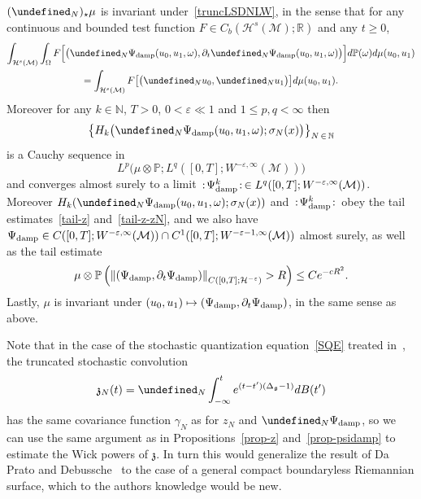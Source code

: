 \documentclass[AHL,Unicode,longabstracts,published]{cedram}
\newcommand{\damp}{\textup{damp}}
\newcommand{\R}{\mathbb{R}}
\newcommand{\Prob}{\mathbb{P}}
\newcommand{\N}{\mathbb{N}}
\let\P= \undefined
\newcommand{\P}{\mathbf{P}}
\newcommand{\M}{\mathcal{M}}
\renewcommand{\H}{\mathcal{H}}
\newcommand{\g}{\mathfrak{g}}
\newcommand{\frkz}{\mathfrak{z}}
\newcommand{\Dlg}{\Delta_{\g}}
\newcommand{\eps}{\varepsilon}
\newcommand{\s}{\sigma}
\newcommand{\dt}{\partial_t}
\renewcommand{\o}{\omega}
\renewcommand{\O}{\Omega}
\begin{document}
\begin{prop}\label{prop-psidamp}
$(\P_N)_{\star}\mu$ is invariant under~\eqref{truncLSDNLW}, in the sense that for any continuous and bounded test function $F\in C_b(\H^s(\M);\R)$ and any $t\ge 0$,
\begin{multline*}
\int_{\H^s(\M)}\int_\O F\Big[\big(\P_N\Psi_\damp(u_0,u_1,\o),\dt\P_N\Psi_\damp(u_0,u_1,\o)\big)\Big]d\Prob(\o)d\mu(u_0,u_1)\\
 = \int_{\H^s(\M)}F\big[\big(\P_Nu_0,\P_Nu_1\big)\big]d\mu(u_0,u_1).
\end{multline*}
Moreover for any $k\in\N$, $T>0$, $0<\eps\ll1$ and $1\leq p,q <\infty$ then
\[
\big\{H_k\big(\P_N\Psi_{\damp}(u_0,u_1,\o);\s_N(x)\big)\big\}_{N\,\in\,\N}
\]
is a Cauchy sequence in
\begin{equation*}
L^p\big(\mu\otimes\Prob;L^q([0,T];W^{-\eps,\infty}(\M))\big)
\end{equation*}
and converges almost surely to a limit $\,:\!\Psi_{\damp}^k\!:\,\in L^q([0,T];W^{-\eps,\infty}(\M))$. Moreover $H_k(\P_N\Psi_{\damp}(u_0,u_1,\o);\s_N(x))$ and $\,:\!\Psi_{\damp}^k\!:\,$ obey the tail estimates~\eqref{tail-z} and~\eqref{tail-z-zN}, and we also have $\Psi_{\damp}\in C([0,T];W^{-\eps,\infty}(\M))\cap C^1([0,T];W^{-\eps-1,\infty}(\M))$ almost surely, as well as the tail estimate
\begin{equation}\label{tail-sup}
\mu\otimes\Prob\left(\left\|(\Psi_{\damp},\dt\Psi_\damp)\right\|_{C\left([0,T];\H^{-\eps}\right)}>R\right)\leq Ce^{-cR^2}.
\end{equation}
Lastly, $\mu$ is invariant under $(u_0,u_1)\mapsto (\Psi_\damp,\dt\Psi_\damp)$, in the same sense as above.
\end{prop}

\begin{rema}\label{rk-SQE}
Note that in the case of the stochastic quantization equation~\eqref{SQE} treated in~\cite{DPD}, the truncated stochastic convolution
\begin{equation*}
\frkz_N(t) = \P_N\int_{-\infty}^t e^{(t-t')(\Dlg-1)}dB(t')
\end{equation*}
has the same covariance function $\gamma_N$ as for $z_N$ and $\P_N\Psi_{\damp}$, so we can use the same argument as in Propositions~\ref{prop-z} and~\ref{prop-psidamp} to estimate the Wick powers of $\frkz$. In turn this would generalize the result of Da Prato and Debussche~\cite{DPD} to the case of a general compact boundaryless Riemannian surface, which to the authors knowledge would be new.
\end{rema}
\end{document}
